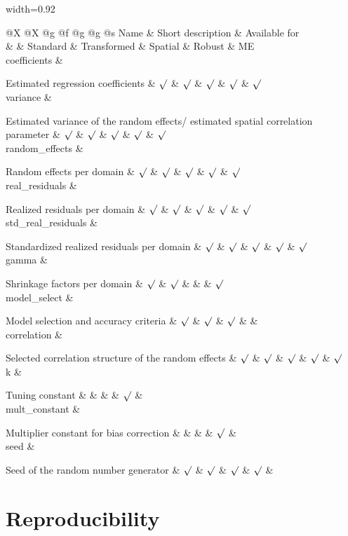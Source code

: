 width=0.92

@X @X @g @f @g @g @s Name \& Short description \& Available for\\
\& \& Standard \& Transformed \& Spatial \& Robust \& ME\\
coefficients \&

Estimated regression coefficients \& \(\surd\) \& \(\surd\) \& \(\surd\) \&
\(\surd\) \& \(\surd\)\\
variance \&

Estimated variance of the random effects/ estimated spatial correlation
parameter \& \(\surd\) \& \(\surd\) \& \(\surd\) \& \(\surd\) \& \(\surd\)\\
random\_effects \&

Random effects per domain \& \(\surd\) \& \(\surd\) \& \(\surd\) \& \(\surd\) \&
\(\surd\)\\
real\_residuals \&

Realized residuals per domain \& \(\surd\) \& \(\surd\) \& \(\surd\) \& \(\surd\) \&
\(\surd\)\\
std\_real\_residuals \&

Standardized realized residuals per domain \& \(\surd\) \& \(\surd\) \& \(\surd\)
\& \(\surd\) \& \(\surd\)\\
gamma \&

Shrinkage factors per domain \& \(\surd\) \& \(\surd\) \& \& \& \(\surd\)\\
model\_select \&

Model selection and accuracy criteria \& \(\surd\) \& \(\surd\) \& \(\surd\) \& \&\\
correlation \&

Selected correlation structure of the random effects \& \(\surd\) \& \(\surd\)
\& \(\surd\) \& \(\surd\) \& \(\surd\)\\
k \&

Tuning constant \& \& \& \& \(\surd\) \&\\
mult\_constant \&

Multiplier constant for bias correction \& \& \& \& \(\surd\) \&\\
seed \&

Seed of the random number generator \& \(\surd\) \& \(\surd\) \& \(\surd\) \&
\(\surd\) \&\\

\hypertarget{reproducibility}{%
\section{Reproducibility}\label{reproducibility}}

